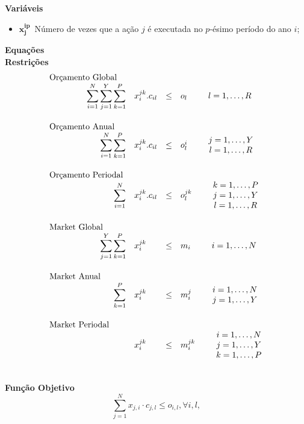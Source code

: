 \documentclass{article}
\newcommand{\topico}[1]{
  \vspace{10pt}
  {\Large \bf #1 }
  \\
}
\newcommand{\variavel}[1]{
  { \Large $ \bm{ #1 } \, $}
}
\newenvironment{constraints}
	{ \[ \begin{array}{rlcll} }
	{ \end{array} \] }
\newcommand{\constraint}[6]{
    \multicolumn{1}{l}{\text{ #1 }} \\ %
    \displaystyle
    #2             %
    & #3           %
	& #4           %
	& #5           %
	\qquad
	\begin{array}{c}
	  #6           %
	\end{array}
	\vspace{14pt}
}
\begin{document}
\topico{Variáveis}

\begin{itemize}
  \item \variavel{x_j^{ip}} Número de vezes que a ação $j$ é executada no $p$-ésimo período do ano $i$;
\end{itemize}

\topico{Equações}

\topico{Restrições}

\begin{constraints}
    \constraint
	  {Orçamento Global}
	  { \sum_{i = 1}^N \sum_{j = 1}^Y \sum_{k = 1}^P }
	  { x_i^{jk} . c_{il}}
	  { \leq }
	  { o_l }
	  { l = 1, \ldots, R }
	\\
    \constraint
      {Orçamento Anual}
      { \sum_{i = 1}^N \sum_{k = 1}^P }
      { x_i^{jk} . c_{il} }
	  { \leq }
	  { o_l^i }
	  { j = 1, \ldots, Y \\ l = 1, \ldots, R}
    \\
	\constraint
	  {Orçamento Periodal}
      { \sum_{i = 1}^N }
      { x_i^{jk} . c_{il} }
	  { \leq }
	  { o_l^{jk} }
	  { k = 1, \ldots, P \\ j = 1, \ldots, Y \\ l = 1, \ldots, R }
	\\
	\constraint
	  {Market Global}
      { \sum_{j = 1}^Y \sum_{k = 1}^P }
      { x_i^{jk} }
	  { \leq }
	  { m_i }
	  { i = 1, \ldots, N }
	\\
	\constraint
	  {Market Anual}
      { \sum_{k = 1}^P }
      { x_i^{jk} }
	  { \leq }
	  { m_i^j }
	  { i = 1, \ldots, N \\ j = 1, \ldots, Y }
	\\
	\constraint
	  {Market Periodal}
      { }
      { x_i^{jk} }
	  { \leq }
	  { m_i^{jk} }
	  { i = 1, \ldots, N \\ j = 1, \ldots, Y \\ k = 1, \ldots, P}
\end{constraints}

\topico{Função Objetivo}

\begin{equation}
    \sum_{j=1}^{N} x_{j, i} \cdot c_{j,l} \le o_{i,l}, \forall i, l,
  \label{eq:budget}
\end{equation}
\end{document}
